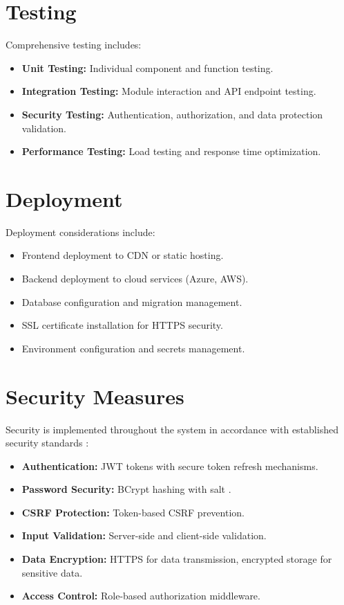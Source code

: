 \section{Testing}

Comprehensive testing includes:
\begin{itemize}
    \item \textbf{Unit Testing:} Individual component and function testing.
    \item \textbf{Integration Testing:} Module interaction and API endpoint testing.
    \item \textbf{Security Testing:} Authentication, authorization, and data protection validation.
    \item \textbf{Performance Testing:} Load testing and response time optimization.
\end{itemize}

\section{Deployment}

Deployment considerations include:
\begin{itemize}
    \item Frontend deployment to CDN or static hosting.
    \item Backend deployment to cloud services (Azure, AWS).
    \item Database configuration and migration management.
    \item SSL certificate installation for HTTPS security.
    \item Environment configuration and secrets management.
\end{itemize}

\section{Security Measures}

Security is implemented throughout the system in accordance with established security standards \cite{iso27001security, owasp2021top10}:
\begin{itemize}
    \item \textbf{Authentication:} JWT tokens with secure token refresh mechanisms.
    \item \textbf{Password Security:} BCrypt hashing with salt \cite{provos1999bcrypt}.
    \item \textbf{CSRF Protection:} Token-based CSRF prevention.
    \item \textbf{Input Validation:} Server-side and client-side validation.
    \item \textbf{Data Encryption:} HTTPS for data transmission, encrypted storage for sensitive data.
    \item \textbf{Access Control:} Role-based authorization middleware.
\end{itemize}

